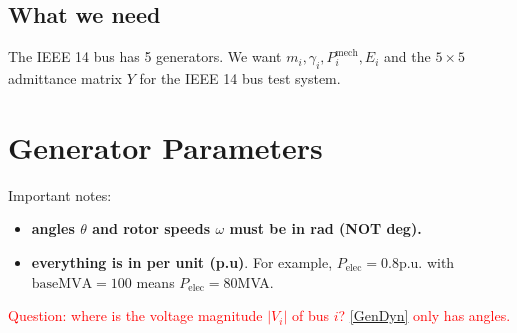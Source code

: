 \documentclass[a4paper,11pt]{article}
\begin{document}
\subsection*{What we need}
The IEEE 14 bus has 5 generators. We want $m_i, \gamma_i, P_{i}^{\text{mech}}, E_{i}$ and the $5\times 5$ admittance matrix $Y$ for the IEEE 14 bus test system.


\section{Generator Parameters} %
\label{sec:generator_parameters}
Important notes:
\begin{itemize}
\item \textbf{angles $\theta$ and rotor speeds $\omega$ must be in rad (NOT deg).}
\item \textbf{everything is in per unit (p.u)}. For example, $P_{\text{elec}} = 0.8$p.u. with $\text{baseMVA}=100$ means $P_{\text{elec}} = 80$MVA.
\end{itemize}
\textcolor{red}{Question: where is the voltage magnitude $|V_i|$ of bus $i$? \eqref{GenDyn} only has angles.}
\end{document}
